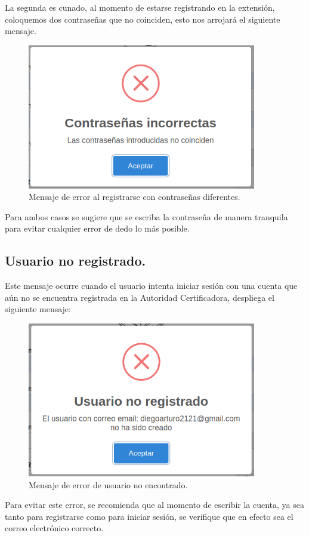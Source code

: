 \documentclass[12pt, a4paper, titlepage]{report}
\begin{document}
        La segunda es cunado, al momento de estarse registrando en la extensión, coloquemos dos contraseñas que no coinciden, esto nos arrojará el siguiente mensaje.
        \begin{figure}[H]
            \centering
            \includegraphics[width=10cm]{imagenes/Registro/UI_contraseniasNoIguales.png}
            \caption{Mensaje de error al registrarse con contraseñas diferentes.}
            \label{fig:contraseniasNoIguales}
        \end{figure}
        Para ambos casos se sugiere que se escriba la contraseña de manera tranquila para evitar cualquier error de dedo lo más posible.
        
        \subsection{Usuario no registrado.}
        Este mensaje ocurre cuando el usuario intenta iniciar sesión con una cuenta que aún no se encuentra registrada en la Autoridad Certificadora, despliega el siguiente mensaje:
        
        \begin{figure}[H]
            \centering
            \includegraphics[width=10cm]{imagenes/Registro/usuarioNoRegistrado.png}
            \caption{Mensaje de error de usuario no encontrado.}
            \label{fig:usuarioNoRegistrado}
        \end{figure}
        
        Para evitar este error, se recomienda que al momento de escribir la cuenta, ya sea tanto para registrarse como para iniciar sesión, se verifique que en efecto sea el correo electrónico correcto.
\end{document}
